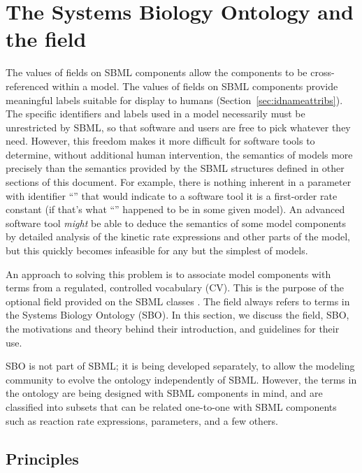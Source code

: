 
\section{The Systems Biology Ontology and the  field}
\label{sec:sboTerm}

The values of  fields on SBML components allow the
components to be cross-referenced within a model. The values of
 fields on SBML components provide meaningful labels
suitable for display to humans (Section~\ref{sec:idnameattribs}).
The specific identifiers and labels used in a model necessarily
must be unrestricted by SBML, so that software and users are free
to pick whatever they need.  However, this freedom makes it more
difficult for software tools to determine, without additional
human intervention, the semantics of models more precisely than
the semantics provided by the SBML structures defined in other
sections of this document. For example, there is nothing inherent
in a parameter with identifier ``'' that would indicate
to a software tool it is a first-order rate constant (if that's
what ``'' happened to be in some given model).  An
advanced software tool \emph{might} be able to deduce the
semantics of some model components by detailed analysis of the
kinetic rate expressions and other parts of the model, but this
quickly becomes infeasible for any but the simplest of models.

An approach to solving this problem is to associate model
components with terms from a regulated, controlled vocabulary
(CV).  This is the purpose of the optional  field
provided on the SBML classes \sboelements.  The 
field always refers to terms in the Systems Biology Ontology
(SBO). In this section, we discuss the  field, SBO,
the motivations and theory behind their introduction, and
guidelines for their use.

SBO is not part of SBML; it is being developed separately, to
allow the modeling community to evolve the ontology independently
of SBML.  However, the terms in the ontology are being designed
with SBML components in mind, and are classified into subsets that
can be related one-to-one with SBML components such as reaction
rate expressions, parameters, and a few others.


\subsection{Principles}
\label{sec:sbo-principles}

